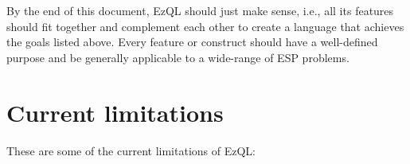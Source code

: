\documentclass{report}
\begin{document}





By the end of this document, EzQL should just make sense, i.e., all
its features should fit together and complement each other to create a
language that achieves the goals listed above. Every feature or
construct should have a well-defined purpose and be generally
applicable to a wide-range of ESP problems.

\section{Current limitations}
\label{sec:current-limitations}

These are some of the current limitations of EzQL:
\end{document}
